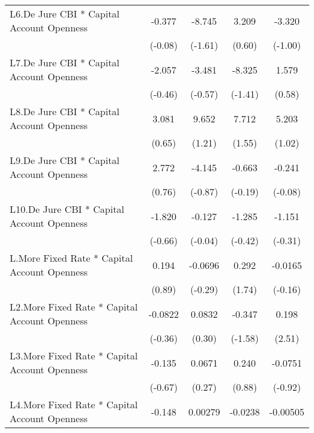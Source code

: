 {\begin{longtable}{l*{4}{c}}
\addlinespace
L6.De Jure CBI * Capital Account Openness&   -0.377         &   -8.745         &    3.209         &   -3.320         \\
                &  (-0.08)         &  (-1.61)         &   (0.60)         &  (-1.00)         \\
\addlinespace
L7.De Jure CBI * Capital Account Openness&   -2.057         &   -3.481         &   -8.325         &    1.579         \\
                &  (-0.46)         &  (-0.57)         &  (-1.41)         &   (0.58)         \\
\addlinespace
L8.De Jure CBI * Capital Account Openness&    3.081         &    9.652         &    7.712         &    5.203         \\
                &   (0.65)         &   (1.21)         &   (1.55)         &   (1.02)         \\
\addlinespace
L9.De Jure CBI * Capital Account Openness&    2.772         &   -4.145         &   -0.663         &   -0.241         \\
                &   (0.76)         &  (-0.87)         &  (-0.19)         &  (-0.08)         \\
\addlinespace
L10.De Jure CBI * Capital Account Openness&   -1.820         &   -0.127         &   -1.285         &   -1.151         \\
                &  (-0.66)         &  (-0.04)         &  (-0.42)         &  (-0.31)         \\
\addlinespace
L.More Fixed Rate * Capital Account Openness&    0.194         &  -0.0696         &    0.292         &  -0.0165         \\
                &   (0.89)         &  (-0.29)         &   (1.74)         &  (-0.16)         \\
\addlinespace
L2.More Fixed Rate * Capital Account Openness&  -0.0822         &   0.0832         &   -0.347         &    0.198\sym{*}  \\
                &  (-0.36)         &   (0.30)         &  (-1.58)         &   (2.51)         \\
\addlinespace
L3.More Fixed Rate * Capital Account Openness&   -0.135         &   0.0671         &    0.240         &  -0.0751         \\
                &  (-0.67)         &   (0.27)         &   (0.88)         &  (-0.92)         \\
\addlinespace
L4.More Fixed Rate * Capital Account Openness&   -0.148         &  0.00279         &  -0.0238         & -0.00505         \\

\end{longtable}}
